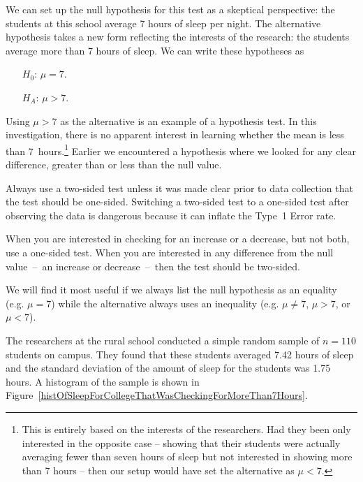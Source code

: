 We can set up the null hypothesis for this test as a skeptical perspective: the students at this school average 7 hours of sleep per night. The alternative hypothesis takes a new form reflecting the interests of the research: the students average more than 7 hours of sleep. We can write these hypotheses as
\begin{itemize}
\setlength{\itemsep}{0mm}
\item[$H_0$:] $\mu = 7$.
\item[$H_A$:] $\mu > 7$.
\end{itemize}
Using $\mu > 7$ as the alternative is an example of a  hypothesis test. In this investigation, there is no apparent interest in learning whether the mean is less than 7~hours.\footnote{This is entirely based on the interests of the researchers. Had they been only interested in the opposite case -- showing that their students were actually averaging fewer than seven hours of sleep but not interested in showing more than 7 hours -- then our setup would have set the alternative as $\mu < 7$.} Earlier we encountered a  hypothesis where we looked for any clear difference, greater than or less than the null value.

Always use a two-sided test unless it was made clear prior to data collection that the test should be one-sided. Switching a two-sided test to a one-sided test after observing the data is dangerous because it can inflate the Type~1 Error rate. 

\begin{tipBox}{
When you are interested in checking for an increase or a decrease, but not both, use a one-sided test. When you are interested in any difference from the null value~--~an increase or decrease~--~then the test should be two-sided.\vspace{0.5mm}}
\end{tipBox}

\begin{tipBox}{
We will find it most useful if we always list the null hypothesis as an equality (e.g. $\mu = 7$) while the alternative always uses an inequality (e.g. $\mu\neq7$, $\mu>7$, or $\mu<7$).}
\end{tipBox}

The researchers at the rural school conducted a simple random sample of $n=110$ students on campus. They found that these students averaged 7.42 hours of sleep and the standard deviation of the amount of sleep for the students was 1.75 hours. A histogram of the sample is shown in Figure~\ref{histOfSleepForCollegeThatWasCheckingForMoreThan7Hours}.

